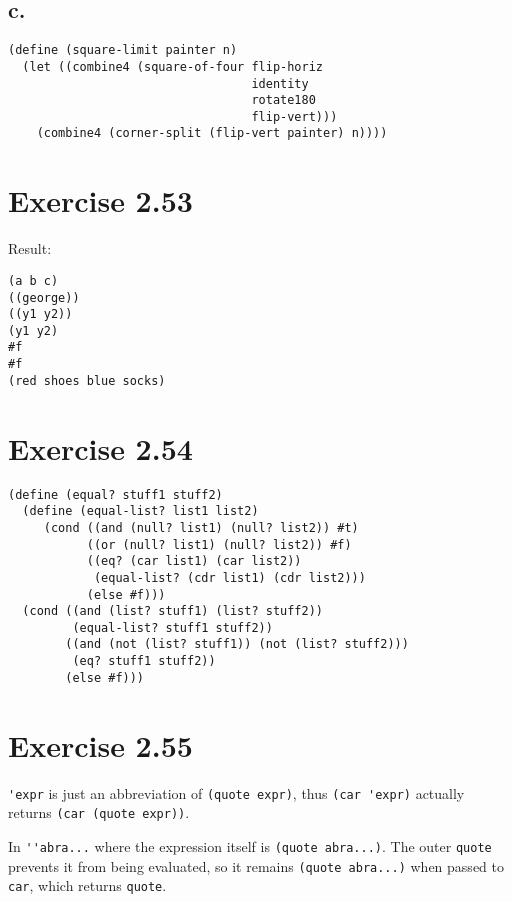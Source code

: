 \documentclass[../main.tex]{subfiles}
\begin{document}
\subsection{c.}

\begin{lstlisting}
(define (square-limit painter n)
  (let ((combine4 (square-of-four flip-horiz
                                  identity
                                  rotate180
                                  flip-vert)))
    (combine4 (corner-split (flip-vert painter) n))))
\end{lstlisting}

\section{Exercise 2.53}

Result:

\begin{lstlisting}
(a b c)
((george))
((y1 y2))
(y1 y2)
#f
#f
(red shoes blue socks)
\end{lstlisting}

\section{Exercise 2.54}

\begin{lstlisting}
(define (equal? stuff1 stuff2)
  (define (equal-list? list1 list2)
     (cond ((and (null? list1) (null? list2)) #t)
           ((or (null? list1) (null? list2)) #f)
           ((eq? (car list1) (car list2))
            (equal-list? (cdr list1) (cdr list2)))
           (else #f)))
  (cond ((and (list? stuff1) (list? stuff2))
         (equal-list? stuff1 stuff2))
        ((and (not (list? stuff1)) (not (list? stuff2)))
         (eq? stuff1 stuff2))
        (else #f)))
\end{lstlisting}

\section{Exercise 2.55}

\lstinline{'expr} is just an abbreviation of
 \lstinline{(quote expr)}, thus \lstinline{(car 'expr)}
 actually returns \lstinline{(car (quote expr))}.

In \lstinline{''abra...} where the expression itself
 is \lstinline{(quote abra...)}. The outer \lstinline{quote}
 prevents it from being evaluated, so it remains
 \lstinline{(quote abra...)} when passed to \lstinline{car},
 which returns \lstinline{quote}.
\end{document}
